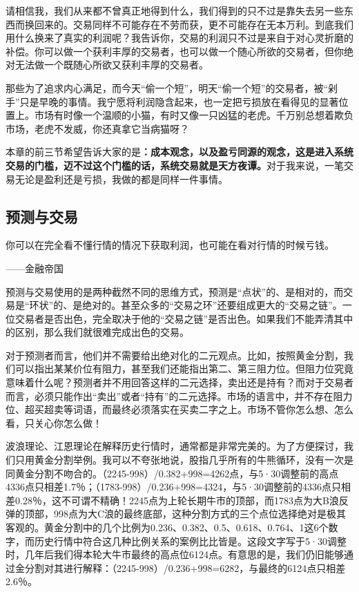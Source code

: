 请相信我，我们从来都不曾真正地得到什么，我们得到的只不过是靠失去另一些东西而换回来的。交易同样不可能存在不劳而获，更不可能存在无本万利。到底我们用什么换来了真实的利润呢？我告诉你，交易的利润只不过是来自于对心灵折磨的补偿。你可以做一个获利丰厚的交易者，也可以做一个随心所欲的交易者，但你绝对无法做一个既随心所欲又获利丰厚的交易者。

那些为了追求内心满足，而今天“偷一个短”，明天“偷一个短”的交易者，被“剁手”只是早晚的事情。我宁愿将利润隐含起来，也一定把亏损放在看得见的显著位置上。市场有时像一个温顺的小猫，有时又像一只凶猛的老虎。千万别总想着欺负市场，老虎不发威，你还真拿它当病猫呀？

本章的前三节希望告诉大家的是\textbf{：成本观念，以及盈亏同源的观念，这是进入系统交易的门槛，迈不过这个门槛的话，系统交易就是天方夜谭。}对于我来说，一笔交易无论是盈利还是亏损，我做的都是同样一件事情。

\subsection{预测与交易}

{\kaishu
你可以在完全看不懂行情的情况下获取利润，也可能在看对行情的时候亏钱。

\hfill ——金融帝国
}

预测与交易使用的是两种截然不同的思维方式，预测是“点状”的、是相对的，而交易是“环状”的、是绝对的。甚至众多的“交易之环”还要组成更大的“交易之链”。一位交易者是否出色，完全取决于他的“交易之链”是否出色。如果我们不能弄清其中的区别，那么我们就很难完成出色的交易。

对于预测者而言，他们并不需要给出绝对化的二元观点。比如，按照黄金分割，我们可以指出某某价位有阻力，甚至我们还能指出第二、第三阻力位。但阻力位究竟意味着什么呢？预测者并不用回答这样的二元选择，卖出还是持有？而对于交易者而言，必须只能作出“卖出”或者“持有”的二元选择。市场的语言中，并不存在阻力位、超买超卖等词语，而最终必须落实在买卖二字之上。市场不管你怎么想、怎么看，只关心你怎么做！

波浪理论、江恩理论在解释历史行情时，通常都是非常完美的。为了方便探讨，我们只用黄金分割举例。我可以不夸张地说，股指几乎所有的牛熊循环，没有一次是同黄金分割不吻合的。（2245-998）/0.382+998=4262点，与5·30调整前的高点4336点只相差1.7％；（1783-998）/0.236+998=4324，与5·30调整前的4336点只相差0.28％，这不可谓不精确！2245点为上轮长期牛市的顶部，而1783点为大B浪反弹的顶部，998点为大C浪的最终底部，这种分割方式的三个点位选择绝对是极其客观的。黄金分割中的几个比例为0.236、0.382、0.5、0.618、0.764、1这6个数字，而历史行情中符合这几种比例关系的案例比比皆是。这段文字写于5·30调整时，几年后我们得本轮大牛市最终的高点位6124点。有意思的是，我们仍旧能够通过金分割对其进行解释：（2245-998）/0.236+998=6282，与最终的6124点只相差2.6％。

